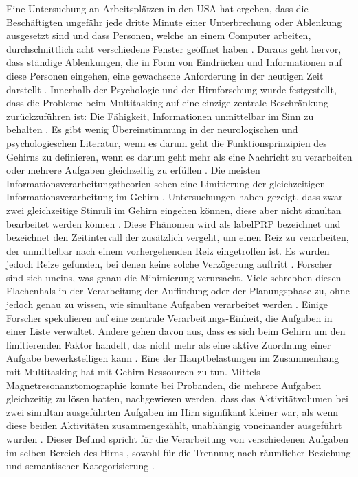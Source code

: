 Eine Untersuchung an Arbeitsplätzen in den USA hat ergeben, dass die Beschäftigten ungefähr jede dritte Minute einer Unterbrechung oder Ablenkung ausgesetzt sind und dass Personen, welche an einem Computer arbeiten, durchschnittlich acht verschiedene Fenster geöffnet haben \cite{Thompson2005}. Daraus geht hervor, dass ständige Ablenkungen, die in Form von Eindrücken und Informationen auf diese Personen eingehen, eine gewachsene Anforderung in der heutigen Zeit darstellt \cite{Klingberg2008}. Innerhalb der Psychologie und der Hirnforschung wurde festgestellt, dass die Probleme beim Multitasking auf eine einzige zentrale Beschränkung zurückzuführen ist: Die Fähigkeit, Informationen unmittelbar im Sinn zu behalten \cite{Klingberg2008}. Es gibt wenig Übereinstimmung in der neurologischen und psychologieschen Literatur, wenn es darum geht die Funktionsprinzipien des Gehirns zu definieren, wenn es darum geht mehr als eine Nachricht zu verarbeiten oder mehrere Aufgaben gleichzeitig zu erfüllen \cite{Kieras1997}. Die meisten Informationsverarbeitungstheorien sehen eine Limitierung der gleichzeitigen Informationsverarbeitung im Gehirn \cite{Kieras1997, Pashler2000}. Untersuchungen haben gezeigt, dass zwar zwei gleichzeitige Stimuli im Gehirn eingehen können, diese aber nicht simultan bearbeitet werden können \cite{Pashler2000}. Diese Phänomen wird als \gls{labelPRP} bezeichnet \cite{Welford1952} und bezeichnet den Zeitintervall der zusätzlich vergeht, um einen Reiz zu verarbeiten, der unmittelbar nach einem vorhergehenden Reiz eingetroffen ist. Es wurden jedoch Reize gefunden, bei denen keine solche Verzögerung auftritt \cite{Foehr2006}. Forscher sind sich uneins, was genau die Minimierung verursacht. Viele schrebben diesen Flachenhals in der Verarbeitung der Auffindung oder der Planungsphase zu, ohne jedoch genau zu wissen, wie simultane Aufgaben verarbeitet werden \cite{Kieras1997}. Einige Forscher spekulieren auf eine zentrale Verarbeitungs-Einheit, die Aufgaben in einer Liste verwaltet. Andere gehen davon aus, dass es sich beim Gehirn um den limitierenden Faktor handelt, das nicht mehr als eine aktive Zuordnung einer Aufgabe bewerkstelligen kann \cite{Pashler2000}. Eine der Hauptbelastungen im Zusammenhang mit Multitasking hat mit Gehirn Ressourcen zu tun. Mittels Magnetresonanztomographie konnte bei Probanden, die mehrere Aufgaben gleichzeitig zu lösen hatten, nachgewiesen werden, dass das Aktivitätvolumen bei zwei simultan ausgeführten Aufgaben im Hirn signifikant kleiner war, als wenn diese beiden Aktivitäten zusammengezählt, unabhängig voneinander ausgeführt wurden \cite{Just2001, Klingberg1997}. Dieser Befund spricht für die Verarbeitung von verschiedenen Aufgaben im selben Bereich des Hirns \cite{Klingberg1997}, sowohl für die Trennung nach räumlicher Beziehung und semantischer Kategorisierung \cite{Just2001}.  \\
